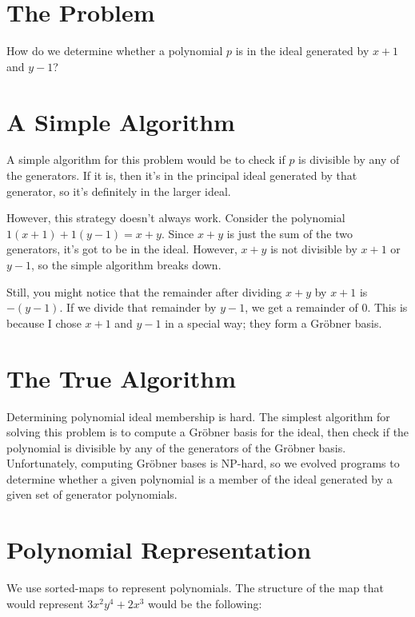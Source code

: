 \documentclass[20pt]{extarticle}
\begin{document}
\newpage
\section*{The Problem}

    How do we determine whether a polynomial $p$ is in the ideal generated by $x+1$ and $y-1$?

\newpage
\section*{A Simple Algorithm}

    A simple algorithm for this problem would be to check if $p$ is divisible by any of the generators.
    If it is, then it's in the principal ideal generated by that generator, so it's definitely in the larger ideal.

    However, this strategy doesn't always work.
    Consider the polynomial $1(x+1) + 1(y-1) = x + y$.
    Since $x+y$ is just the sum of the two generators, it's got to be in the ideal.
    However, $x + y$ is not divisible by $x+1$ or $y-1$, so the simple algorithm breaks down.

    Still, you might notice that the remainder after dividing $x+y$ by $x+1$ is $-(y-1)$.
    If we divide that remainder by $y-1$, we get a remainder of 0.
    This is because I chose $x+1$ and $y-1$ in a special way; they form a Gr\"obner basis.

\newpage
\section*{The True Algorithm}

    Determining polynomial ideal membership is hard.
    The simplest algorithm for solving this problem is to compute a Gr\"obner basis for the ideal, then check if the polynomial is divisible by any of the generators of the Gr\"obner basis.
    Unfortunately, computing Gr\"obner bases is NP-hard, so we evolved programs to determine whether a given polynomial is a member of the ideal generated by a given set of generator polynomials.

\newpage
\section*{Polynomial Representation}

We use sorted-maps to represent polynomials. The structure of the map that would represent $3x^2y^4 + 2x^3$ would be the following:
\end{document}
